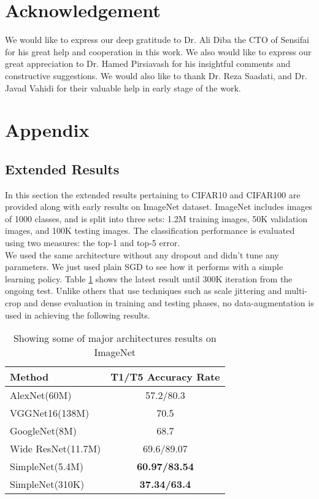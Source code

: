 \documentclass{article} \usepackage{lets_keepit_simple,times}
\begin{document}
\section{Acknowledgement} \label{sec:ackn}
We would like to express our deep gratitude to Dr. Ali Diba the CTO of Sensifai for his great help and cooperation in this work. We also would like to express our great appreciation to Dr. Hamed Pirsiavash for his insightful comments and constructive suggestions. We would also like to thank Dr. Reza Saadati, and Dr. Javad Vahidi for their valuable help in early stage of the work. 





\newpage
\renewcommand{\appendixname}{Annex}
\appendix
\section{Appendix}
\subsection{Extended Results}
In this section the extended results pertaining to CIFAR10 and CIFAR100 are provided along with early results on ImageNet\cite{Russakovsky_ImageNet_2015} dataset.
ImageNet includes images of 1000 classes, and is split into three sets: 1.2M training images, 50K validation images, and 100K testing images. The classification performance is evaluated using two measures: the top-1 and top-5 error.\\
We used the same architecture without any dropout and didn't tune any parameters. We just used plain SGD to see how it performs with a simple learning policy. Table \ref{tab:imagenet_appndx} shows the latest result until 300K iteration from the ongoing test. Unlike others that use techniques such as scale jittering and multi-crop and dense evaluation in training and testing phases, no data-augmentation is used in achieving the following results.   


\begin{table}[h!]
\caption{Showing some of major architectures results on ImageNet}\label{tab:imagenet_appndx}
\begin{center}
\begin{tabular}{lc}
\textbf{Method} & \textbf{T1/T5 Accuracy Rate} \\ \hline
AlexNet(60M)\cite{AlexKrizhevsky_imgnet_2012}    &	57.2/80.3 \\
VGGNet16(138M)\cite{Simonyan_VGG_2014}	& 70.5\- \\
GoogleNet(8M) \cite{Szegedy_googlenet_2015}  &	68.7\- \\
Wide ResNet(11.7M)\cite{Zagoruyko_WRN_2016}	& 69.6/89.07\\
SimpleNet(5.4M)  &	\textbf{60.97/83.54}\\
SimpleNet(310K)	& \textbf{37.34/63.4}\\\hline
\end{tabular}
\end{center}
\end{table}
\end{document}
